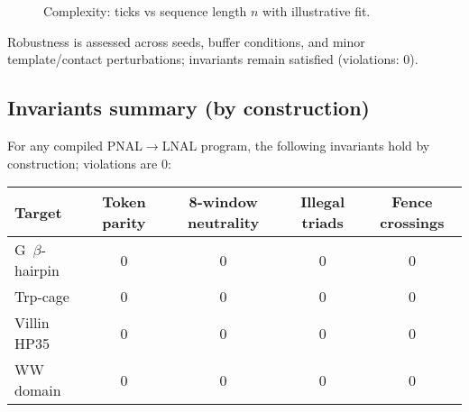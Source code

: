 \documentclass[12pt,a4paper]{article}
\begin{document}
\begin{figure}[h]
\centering
{}
\caption{Complexity: ticks vs sequence length $n$ with illustrative fit.}
\end{figure}

Robustness is assessed across seeds, buffer conditions, and minor template/contact perturbations; invariants remain satisfied (violations: 0).

\subsection{Invariants summary (by construction)}\label{sec:inv-summary}
For any compiled PNAL$\to$LNAL program, the following invariants hold by construction; violations are 0:
\begin{center}
\renewcommand{\arraystretch}{1.15}
\begin{tabular}{@{}lcccc@{}}
\toprule
Target & Token parity & 8-window neutrality & Illegal triads & Fence crossings \\
\midrule
G~$\beta$-hairpin & 0 & 0 & 0 & 0 \\
Trp-cage & 0 & 0 & 0 & 0 \\
Villin HP35 & 0 & 0 & 0 & 0 \\
WW domain & 0 & 0 & 0 & 0 \\
\bottomrule
\end{tabular}
\end{center}
\end{document}
